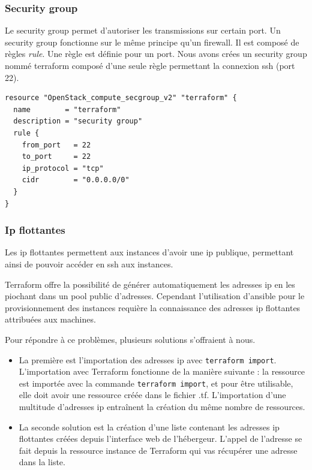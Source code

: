 \documentclass[]{article}
\begin{document}
\subsubsection{Security group}\label{security-group}

Le security group permet d'autoriser les transmissions sur certain port.
Un security group fonctionne sur le même principe qu'un firewall. Il est
composé de règles \emph{rule}. Une règle est définie pour un port. Nous
avons crées un security group nommé \og terraform
\fg composé d'une seule règle permettant la connexion ssh
(port 22).
\begin{verbatim}
resource "OpenStack_compute_secgroup_v2" "terraform" {
  name        = "terraform"
  description = "security group"
  rule {
    from_port   = 22
    to_port     = 22
    ip_protocol = "tcp"
    cidr        = "0.0.0.0/0"
  }
}
\end{verbatim}

\subsubsection{Ip flottantes}\label{ip-flottantes}

Les ip flottantes permettent aux instances d'avoir une ip publique, permettant ainsi de pouvoir accéder en ssh aux instances.

Terraform offre la possibilité de générer automatiquement les adresses ip en les
piochant dans un pool public d'adresses. Cependant l'utilisation
d'ansible pour le provisionnement des instances requière la connaissance des adresses ip flottantes attribuées aux machines.

Pour répondre à ce problèmes, plusieurs solutions s'offraient à nous. 
\begin{itemize}
\item La première est l'importation des adresses ip avec
\texttt{terraform\ import}. \\
L'importation avec Terraform fonctionne de la manière
suivante : la ressource est importée avec la commande \texttt{terraform\ import}, et pour être
utilisable, elle doit avoir une ressource créée dans le fichier .tf.
L'importation d'une multitude d'adresses ip entraînent la création du
même nombre de ressources. 
\item La seconde solution est la création d'une liste contenant
les adresses ip flottantes créées depuis l'interface web de l'hébergeur.
L'appel de l'adresse se fait depuis la ressource instance de Terraform
qui vas récupérer une adresse dans la liste.
\end{itemize}
\end{document}
